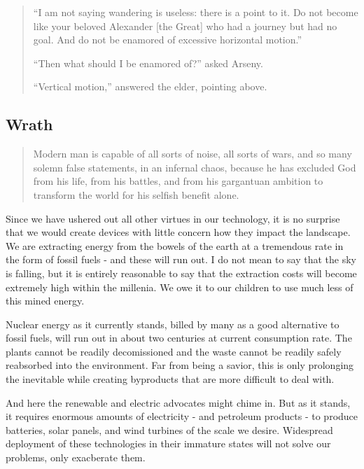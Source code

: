 \documentclass[letterpaper]{article}
\begin{document}
\begin{quote}
  ``I am not saying wandering is useless: there is a point to it. Do not become like your beloved Alexander [the Great] who had a journey but had no goal. And do not be enamored of excessive horizontal motion.''

  ``Then what should I be enamored of?'' asked Arseny.

  ``Vertical motion,'' answered the elder, pointing above.
\end{quote}

\subsection{Wrath}

\begin{quote}
  Modern man is capable of all sorts of noise, all sorts of wars, and so many solemn false statements, in an infernal chaos, because he has excluded God from his life, from his battles, and from his gargantuan ambition to transform the world for his selfish benefit alone.
\end{quote}

Since we have ushered out all other virtues in our technology, it is no surprise that we would create devices with little concern how they impact the landscape. We are extracting energy from the bowels of the earth at a tremendous rate in the form of fossil fuels - and these will run out. I do not mean to say that the sky is falling, but it is entirely reasonable to say that the extraction costs will become extremely high within the millenia. We owe it to our children to use much less of this mined energy.

Nuclear energy as it currently stands, billed by many as a good alternative to fossil fuels, will run out in about two centuries at current consumption rate. The plants cannot be readily decomissioned and the waste cannot be readily safely reabsorbed into the environment. Far from being a savior, this is only prolonging the inevitable while creating byproducts that are more difficult to deal with.

And here the renewable and electric advocates might chime in. But as it stands, it requires enormous amounts of electricity - and petroleum products - to produce batteries, solar panels, and wind turbines of the scale we desire. Widespread deployment of these technologies in their immature states will not solve our problems, only exacberate them.
\end{document}
